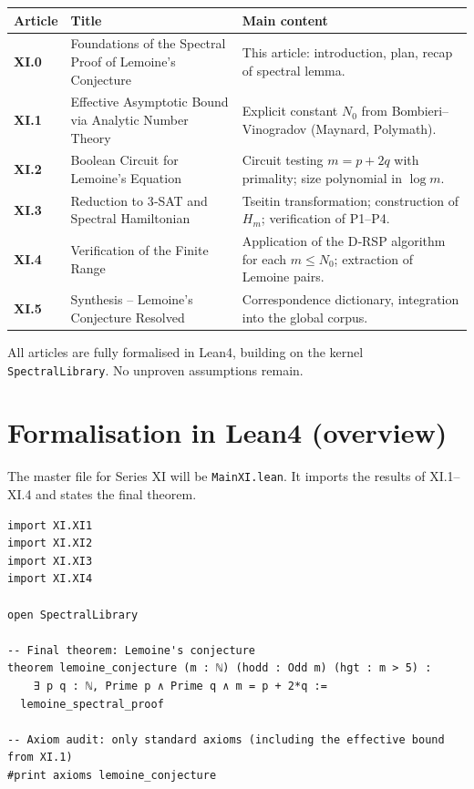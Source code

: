 \documentclass[11pt,a4paper]{article}
\begin{document}
\begin{center}
\small
\begin{tabular}{@{}>{\bfseries}l>{\raggedright\arraybackslash}p{4.5cm}>{\raggedright\arraybackslash}p{6cm}@{}}
\toprule
\textbf{Article} & \textbf{Title} & \textbf{Main content} \\
\midrule
XI.0 & Foundations of the Spectral Proof of Lemoine's Conjecture & This article: introduction, plan, recap of spectral lemma. \\
XI.1 & Effective Asymptotic Bound via Analytic Number Theory & Explicit constant \(N_0\) from Bombieri–Vinogradov (Maynard, Polymath). \\
XI.2 & Boolean Circuit for Lemoine's Equation & Circuit testing \(m = p + 2q\) with primality; size polynomial in \(\log m\). \\
XI.3 & Reduction to 3‑SAT and Spectral Hamiltonian & Tseitin transformation; construction of \(H_m\); verification of P1–P4. \\
XI.4 & Verification of the Finite Range & Application of the D‑RSP algorithm for each \(m \le N_0\); extraction of Lemoine pairs. \\
XI.5 & Synthesis – Lemoine's Conjecture Resolved & Correspondence dictionary, integration into the global corpus. \\
\bottomrule
\end{tabular}
\normalsize
\end{center}

All articles are fully formalised in Lean4, building on the kernel \texttt{SpectralLibrary}. No unproven assumptions remain.

\section{Formalisation in Lean4 (overview)}

The master file for Series XI will be \texttt{MainXI.lean}. It imports the results of XI.1–XI.4 and states the final theorem.

\begin{lstlisting}[style=lean, caption={MainXI.lean (final)}]
import XI.XI1
import XI.XI2
import XI.XI3
import XI.XI4

open SpectralLibrary

-- Final theorem: Lemoine's conjecture
theorem lemoine_conjecture (m : ℕ) (hodd : Odd m) (hgt : m > 5) :
    ∃ p q : ℕ, Prime p ∧ Prime q ∧ m = p + 2*q :=
  lemoine_spectral_proof

-- Axiom audit: only standard axioms (including the effective bound from XI.1)
#print axioms lemoine_conjecture
\end{lstlisting}
\end{document}
